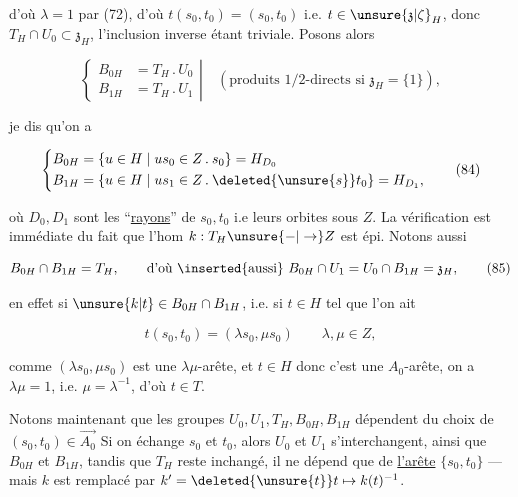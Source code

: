 
d'où $\lambda=1$ par (72), d'où $t(s_0,t_0)=(s_0,t_0)$ i.e. $t\in\unsure{\mathfrak z|\zeta}_H$, donc $T_H\cap U_0\subset\mathfrak z_H$, l'inclusion inverse étant triviale.  Posons alors

\[
\left\{\begin{aligned}
B_{0H}&=T_H\mathbin{.}U_0\\
B_{1H}&=T_H\mathbin{.}U_1
\end{aligned}\right|\quad(\text{produits }1/2\text{-directs si }\mathfrak z_H=\{1\}),
\tag*{(83)}
\]

je dis qu'on a

\[
\left\{\begin{aligned}
B_{0H}&=\{u\in H\mid us_0\in Z\mathbin{.}s_0\}=H_{D_0}\\
B_{1H}&=\{u\in H\mid us_1\in Z\mathbin{.}\deleted{\unsure{s}}t_0\}=H_{D_1},
\end{aligned}\right.
\tag*{(84)}
\]

où $D_0,D_1$ sont les \textquotedblleft{}\uline{rayons}\textquotedblright{} de $s_0,t_0$ i.e leurs orbites sous $Z$. La vérification est immédiate du fait que l'hom $k:T_H\unsure{-|\to}Z$ est épi. Notons aussi

\[
B_{0H}\cap B_{1H}=T_H,\qquad\text{d'où \inserted{aussi} }B_{0H}\cap U_1=U_0\cap B_{1H}=\mathfrak z_H,
\tag*{(85)}
\]

en effet si $\unsure{k|t}\in B_{0H}\cap B_{1H}$, i.e. si $t\in H$ tel que l'on ait

\[
t(s_0,t_0)=(\lambda s_0,\mu s_0)\qquad\lambda,\mu\in Z,
\]

comme $(\lambda s_0,\mu s_0)$ est une $\lambda\mu$-arête, et $t\in H$\unsure{,} donc c'est une $A_0$-arête, on a $\lambda\mu=1$, i.e. $\mu=\lambda^{-1}$, d'où $t\in T$. 

Notons maintenant que les groupes  $U_0,U_1,T_H,B_{0H},B_{1H}$ dépendent du choix de $(s_0,t_0)\in\overrightarrow{A_0}$ Si on échange $s_0$ et $t_0$, alors $U_0$ et $U_1$ s'interchangent, ainsi que $B_{0H}$ et $B_{1H}$, tandis que $T_H$ reste inchangé, il ne dépend que de \uline{l'arête} $\{s_0,t_0\}$ --- mais $k$ est remplacé par $k'=\deleted{\unsure{t}}t\mapsto k(t)^{-1}$.

